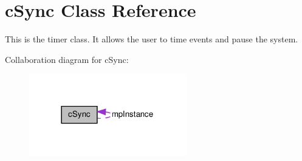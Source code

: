 \hypertarget{classc_sync}{
\section{cSync Class Reference}
\label{classc_sync}
}


This is the timer class. It allows the user to time events and pause the system.  




Collaboration diagram for cSync:
\nopagebreak
\begin{figure}[H]
\begin{center}
\leavevmode
\includegraphics[width=194pt]{classc_sync__coll__graph}
\end{center}
\end{figure}
